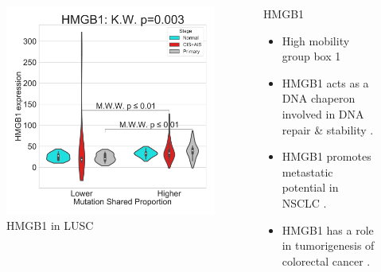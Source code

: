 \documentclass{beamer}
\begin{document}
\begin{frame}[allowframebreaks]
                    \begin{columns}
                        \begin{column}{0.4 \textwidth}
                            \begin{figure}
                                \includegraphics[width=\linewidth]{figures/DEG/Violin/STAR.TPM.SQC.MSP-Median.senescence/Mutation Shared Proportion_HMGB1.pdf}
                                \caption{HMGB1 in LUSC}
                            \end{figure}
                        \end{column}
                        \begin{column}{0.55 \textwidth}
                            \begin{block}{HMGB1}
                                \begin{itemize}
                                    \item High mobility group box 1
                                    \item HMGB1 acts as a DNA chaperon involved in DNA repair \& stability \cite{HMGB1-01}.
                                    \item HMGB1 promotes metastatic potential in NSCLC \cite{HMGB1-02}.
                                    \item HMGB1 has a role in tumorigenesis of colorectal cancer \cite{HMGB1-03}.
                                \end{itemize}
                            \end{block}
                        \end{column}
                    \end{columns}


\end{frame}
\end{document}
